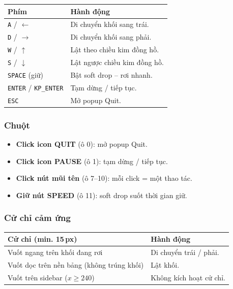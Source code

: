 \documentclass[12pt,a4paper]{article}
\begin{document}
\vspace{4pt}
\begin{tabularx}{\linewidth}{|l|X|}
    \hline
    \textbf{Phím}                                   & \textbf{Hành động} \\
    \hline
    \texttt{A} / \texttt{$\leftarrow$}              & Di chuyển khối sang trái. \\
    \hline
    \texttt{D} / \texttt{$\rightarrow$}             & Di chuyển khối sang phải. \\
    \hline
    \texttt{W} / \texttt{$\uparrow$}               & Lật theo chiều kim đồng hồ. \\
    \hline
    \texttt{S} / \texttt{$\downarrow$}             & Lật ngược chiều kim đồng hồ. \\
    \hline
    \texttt{SPACE} (giữ)                            & Bật soft drop -- rơi nhanh. \\
    \hline
    \texttt{ENTER} / \texttt{KP\_ENTER}             & Tạm dừng / tiếp tục. \\
    \hline
    \texttt{ESC}                                    & Mở popup Quit. \\
    \hline
\end{tabularx}

\subsubsection{Chuột}

\begin{itemize}
    \item \textbf{Click icon QUIT} (ô 0): mở popup Quit.
    \item \textbf{Click icon PAUSE} (ô 1): tạm dừng / tiếp tục.
    \item \textbf{Click nút mũi tên} (ô 7--10): mỗi click = một thao tác.
    \item \textbf{Giữ nút SPEED} (ô 11): soft drop suốt thời gian giữ.
\end{itemize}

\subsubsection{Cử chỉ cảm ứng}

\vspace{4pt}
\begin{tabularx}{\linewidth}{|l|X|}
    \hline
    \textbf{Cử chỉ (min. 15\,px)}              & \textbf{Hành động} \\
    \hline
    Vuốt ngang trên khối đang rơi              & Di chuyển trái / phải. \\
    \hline
    Vuốt dọc trên nền bảng (không trúng khối) & Lật khối. \\
    \hline
    Vuốt trên sidebar ($x \geq 240$)           & Không kích hoạt cử chỉ. \\
    \hline
\end{tabularx}
\end{document}
